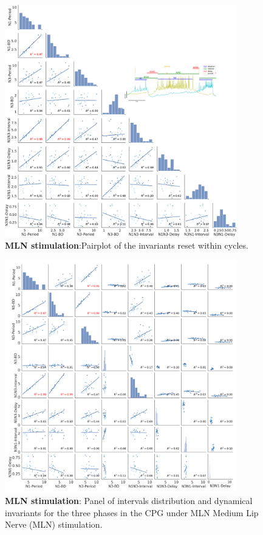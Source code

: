 \begin{figure}[htbp]
	\centering
	\includegraphics[width=0.9\textwidth]{./invariants/data/SUSSEX/MLN_driven/images/panel_with_pairplot.pdf}
	\caption{\textbf{MLN stimulation}:Pairplot of the invariants reset within cycles.}
	\label{fig:mln stimulation pairplot}
\end{figure}


\begin{figure}[htbp]
	\centering
	\includegraphics[width=0.9\textwidth]{./invariants/data/SUSSEX/MLN_driven/images/_output_pairplot_reset.png}
	\caption{\textbf{MLN stimulation}: Panel of intervals distribution and dynamical invariants for the three phases in the CPG under MLN Medium Lip Nerve (MLN) stimulation.}
	\label{fig:mln stimulation reset pairplot}
\end{figure}


